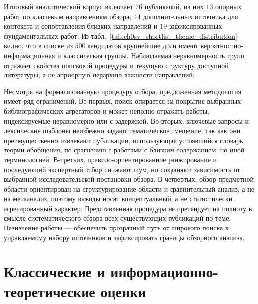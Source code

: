 Итоговый аналитический корпус включает 76 публикаций, из них $13$ опорных работ по ключевым направлениям обзора, $44$ дополнительных источника для контекста и сопоставления близких направлений и $19$ зафиксированных фундаментальных работ.
Из табл.~\ref{tab:ch0sv_shortlist_theme_distribution} видно, что в списке из $500$ кандидатов крупнейшие доли имеют вероятностно-информационная и классическая группы.
Наблюдаемая неравномерность групп отражает свойства поисковой процедуры и текущую структуру доступной литературы, а не априорную иерархию важности направлений.

Несмотря на формализованную процедуру отбора, предложенная методология имеет ряд ограничений.
Во-первых, поиск опирается на покрытие выбранных библиографических агрегаторов и может неполно отражать работы, индексируемые неравномерно или с задержкой.
Во-вторых, ключевые запросы и лексические шаблоны неизбежно задают тематическое смещение, так как они преимущественно извлекают публикации, использующие устоявшийся словарь теории обобщения, по сравнению с работами с близким содержанием, но иной терминологией.
В-третьих, правило-ориентированное ранжирование и последующий экспертный отбор снижают шум, но сохраняют зависимость от выбранной исследовательской постановки обзора.
В-четвертых, обзор предметной области ориентирован на структурирование области и сравнительный анализ, а не на метаанализ, поэтому выводы носят концептуальный, а не статистически агрегированный характер.
Представленная процедура не претендует на полноту в смысле систематического обзора всех существующих публикаций по теме.
Назначение работы --- обеспечить прозрачный путь от широкого поиска к управляемому набору источников и зафиксировать границы обзорного анализа.

\section{Классические и информационно-теоретические оценки}


